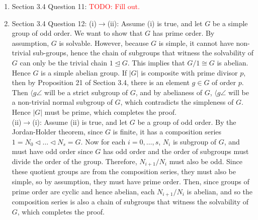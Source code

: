 \documentclass{article}
\newcommand{\TODO}[1]{\textcolor{red}{TODO: #1}}
\begin{document}
\begin{enumerate}
  \item Section 3.4 Question 11: \TODO{Fill out.} 

  \item Section 3.4 Question 12: (i)$\rightarrow$(ii): Assume (i) is true,
    and let $G$ be a simple group of odd order. We want to show that $G$
    has prime order. By assumption, $G$ is solvable. However, because $G$
    is simple, it cannot have non-trivial sub-groups, hence the chain of
    subgroups that witness the solvability of $G$ can only be the trivial
    chain $1\trianglelefteq G$. This implies that $G/1\cong G$ is abelian.
    Hence $G$ is a simple abelian group. If $|G|$ is composite with prime
    divisor $p$, then by Proposition 21 of Section 3.4, there is an element
    $g\in G$ of order $p$. Then $\langle g\angle$ will be a strict subgroup
    of $G$, and by abelianess of $G$, $\langle g\angle$ will be a
    non-trivial normal subgroup of $G$, which contradicts the simpleness of
    $G$. Hence $|G|$ must be prime, which completes the proof. \\

    (ii)$\rightarrow$(i): Assume (ii) is true, and let $G$ be a group of
    odd order. By the Jordan-Holder theorem, since $G$ is finite, it has a
    composition series $1=N_0\triangleleft\ldots\triangleleft N_s=G$. Now
    for each $i=0,\ldots,s$, $N_i$ is subgroup of $G$, and must have odd
    order since $G$ has odd order and the order of subgroups must divide
    the order of the group. Therefore, $N_{i+1}/N_{i}$ must also be odd.
    Since these quotient groups are from the composition series, they must
    also be simple, so by assumption, they must have prime order. Then,
    since groups of prime order are cyclic and hence abelian, each
    $N_{i+1}/N_{i}$ is abelian, and so the composition series is also a
    chain of subgroups that witness the solvability of $G$, which completes
    the proof.
\end{enumerate}
\end{document}
